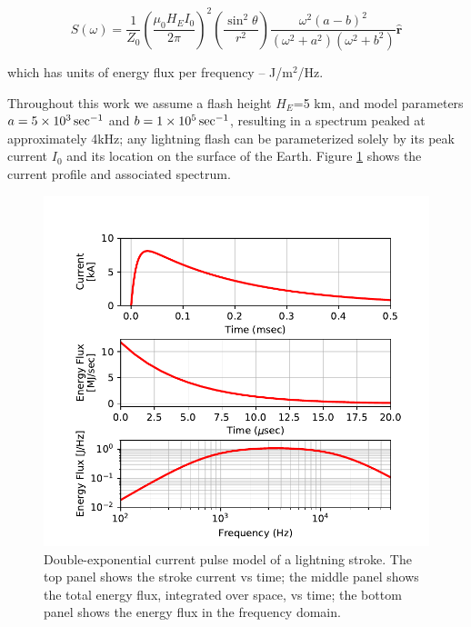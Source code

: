 \begin{equation}
\label{eqn:farfield_power_fd}
S(\omega) = \frac{1}{Z_0}\left(\frac{\mu_0 H_E I_0}{2 \pi}\right)^2\left(\frac{\sin^2\theta}{r^2}\right) \frac{\omega^2(a-b)^2}{(\omega^2 + a^2)(\omega^2 + b^2)}  \mathbf{\hat{r}}
\end{equation}

which has units of energy flux per frequency -- J/m$^2$/Hz.

Throughout this work we assume a flash height $H_E$=5 km, and model parameters $a=5\times 10^{3}\,\mathrm{sec}^{-1}$ and $b=1\times 10^{5}\,\mathrm{sec}^{-1}$, resulting in a spectrum peaked at approximately 4kHz; any lightning flash can be parameterized solely by its peak current $I_0$ and its location on the surface of the Earth. Figure \ref{fig:lightning_spectrum} shows the current profile and associated spectrum.

\begin{figure}
\begin{center}
\includegraphics{figures/Lightning_spectra.pdf}

\caption{Double-exponential current pulse model of a lightning stroke. The top panel shows the stroke current vs time; the middle panel shows the total energy flux, integrated over space, vs time; the bottom panel shows the energy flux in the frequency domain.}
\label{fig:lightning_spectrum}
\end{center}
\end{figure}
